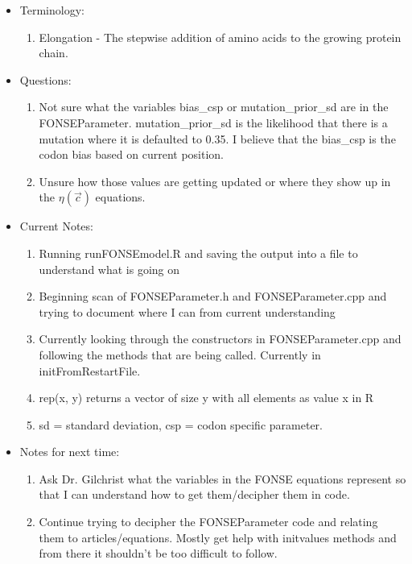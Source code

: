 \documentclass[letterpaper,index=totoc,hyperref,openany]{labbook} %
\begin{document}
\begin{itemize}

	\item Terminology:
	\begin{enumerate}
		\item Elongation - The stepwise addition of amino acids to the growing protein chain.
	\end{enumerate}
	
	\item Questions:
	\begin{enumerate}
		\item Not sure what the variables bias\_csp or mutation\_prior\_sd are in the FONSEParameter. mutation\_prior\_sd is the likelihood that there is a mutation where it is defaulted to 0.35.  I believe that the bias\_csp is the codon bias based on current position.	
		\item Unsure how those values are getting updated or where they show up in the \begin{math} \eta (\vec{c}) \end{math} equations.
	\end{enumerate}

	\item Current Notes:
	\begin{enumerate}
		\item Running runFONSEmodel.R and saving the output into a file to understand what is going on
		\item Beginning scan of FONSEParameter.h and FONSEParameter.cpp and trying to document where I can from current understanding
		\item Currently looking through the constructors in FONSEParameter.cpp and following the methods that are being called. Currently in initFromRestartFile.
		\item rep(x, y) returns a vector of size y with all elements as value x in R
		\item sd = standard deviation, csp = codon specific parameter.
	\end{enumerate}

	\item Notes for next time:
	\begin{enumerate}
		\item Ask Dr. Gilchrist what the variables in the FONSE equations represent so that I can understand how to get them/decipher them in code.
		\item Continue trying to decipher the FONSEParameter code and relating them to articles/equations. Mostly get help with initvalues methods and from there it shouldn't be too difficult to follow.
	\end{enumerate}

\end{itemize}
\end{document}
